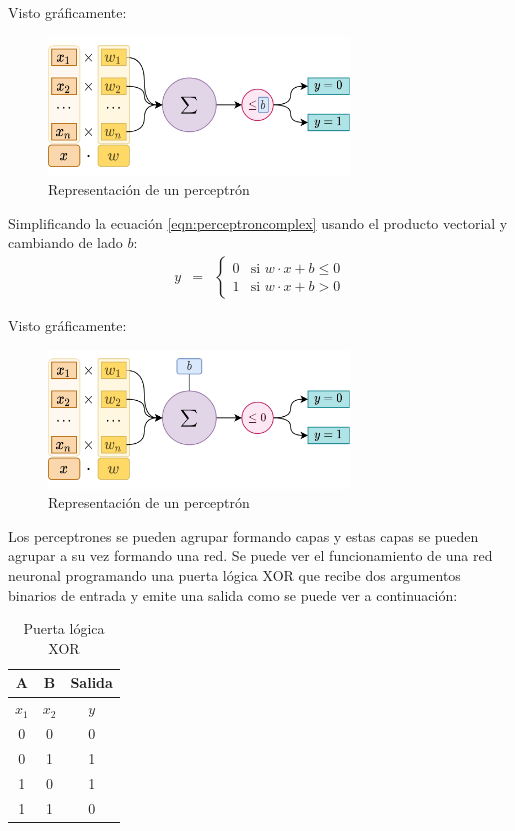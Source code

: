 Visto gráficamente:
\begin{figure}[H]
    \centering
    \includegraphics[width=8cm]{images/state-of-art/perceptron/perceptron_weights.png}
    \caption{Representación de un perceptrón}
    \label{fig:perceptron}
\end{figure}

Simplificando la ecuación \ref{eqn:perceptroncomplex} usando el producto vectorial y cambiando de lado $b$:
\begin{eqnarray}
  y & = & \left\{ \begin{array}{ll}
      0 & \mbox{si } w \cdot x + b \leq 0 \\
      1 & \mbox{si } w \cdot x + b > 0
      \end{array} \right.
      \label{eqn:perceptron}
\end{eqnarray}

Visto gráficamente:
\begin{figure}[H]
    \centering
    \includegraphics[width=8cm]{images/state-of-art/perceptron/perceptron_weights_complex.png}
    \caption{Representación de un perceptrón}
    \label{fig:perceptron}
\end{figure}


Los perceptrones se pueden agrupar formando capas y estas capas se pueden agrupar a su vez formando una red. Se puede ver el funcionamiento de una red neuronal programando una puerta lógica XOR que recibe dos argumentos binarios de entrada y emite una salida como se puede ver a continuación:
\begin{table}[H]
\centering
\begin{tabular}{| c | c | c |}
\hline
A & B & Salida \\
\hline
$x_1$ & $x_2$ & $y$ \\
\hline
0 & 0 & 0 \\
0 & 1 & 1\\
1 & 0 & 1\\
1 & 1 & 0\\
\hline
\end{tabular}
\caption{Puerta lógica XOR}
\end{table}

